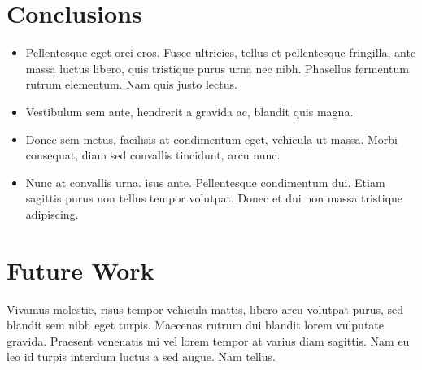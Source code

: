 \documentclass[a0,portrait]{a0poster}
\begin{document}
\begin{multicols}{2}
\color{SaddleBrown} %

\section*{Conclusions}

\begin{itemize}
\item Pellentesque eget orci eros. Fusce ultricies, tellus et pellentesque fringilla, ante massa luctus libero, quis tristique purus urna nec nibh. Phasellus fermentum rutrum elementum. Nam quis justo lectus.
\item Vestibulum sem ante, hendrerit a gravida ac, blandit quis magna.
\item Donec sem metus, facilisis at condimentum eget, vehicula ut massa. Morbi consequat, diam sed convallis tincidunt, arcu nunc.
\item Nunc at convallis urna. isus ante. Pellentesque condimentum dui. Etiam sagittis purus non tellus tempor volutpat. Donec et dui non massa tristique adipiscing.
\end{itemize}

\color{DarkSlateGray} %


\section*{Future Work}

Vivamus molestie, risus tempor vehicula mattis, libero arcu volutpat purus, sed blandit sem nibh eget turpis. Maecenas rutrum dui blandit lorem vulputate gravida. Praesent venenatis mi vel lorem tempor at varius diam sagittis. Nam eu leo id turpis interdum luctus a sed augue. Nam tellus.





\end{multicols}
\end{document}
